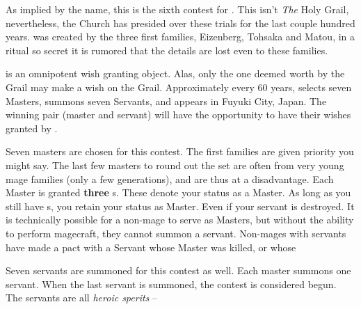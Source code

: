 \documentclass[blue]{FateDarkDawn}
\begin{document}
\name{\bHGW{}}


As implied by the name, this is the sixth contest for \iGrail{}. This isn't \emph{The} Holy Grail, nevertheless, the Church has presided over these trials for the last couple hundred years. \iGrail{} was created by the three first families, Eizenberg, Tohsaka and Matou, in a ritual so secret it is rumored that the details are lost even to these families.

\iGrail{} is an omnipotent wish granting object. Alas, only the one deemed worth by the Grail may make a wish on the Grail. Approximately every 60 years, \iGrail{} selects seven Masters, summons seven Servants, and appears in Fuyuki City, Japan. The winning pair (master and servant) will have the opportunity to have their wishes granted by \iGrail{}.

Seven masters are chosen for this contest. The first families are given priority you might say. The last few masters to round out the set are often from very young mage families (only a few generations), and are thus at a disadvantage. Each Master is granted {\bf three} \iCommand{\MYname}s. These denote your status as a Master. As long as you still have \iCommand{\MYname}s, you retain your status as Master. Even if your servant is destroyed. It is technically possible for a non-mage to serve as Masters, but without the ability to perform magecraft, they cannot summon a servant. Non-mages with servants have made a pact with a Servant whose Master was killed, or whose

Seven servants are summoned for this contest as well. Each master summons one servant. When the last servant is summoned, the contest is considered begun. The servants are all \emph{heroic sperits} --
\end{document}
